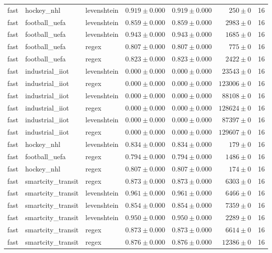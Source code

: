 \begin{table}[htbp]
\begin{tabular}{l l l r r r r}
fast & hockey\_nhl & levenshtein & $0.919\pm0.000$ & $0.919\pm0.000$ & $250\pm0$ & 16 \\
fast & football\_uefa & levenshtein & $0.859\pm0.000$ & $0.859\pm0.000$ & $2983\pm0$ & 16 \\
fast & football\_uefa & levenshtein & $0.943\pm0.000$ & $0.943\pm0.000$ & $1685\pm0$ & 16 \\
fast & football\_uefa & regex & $0.807\pm0.000$ & $0.807\pm0.000$ & $775\pm0$ & 16 \\
fast & football\_uefa & regex & $0.823\pm0.000$ & $0.823\pm0.000$ & $2422\pm0$ & 16 \\
fast & industrial\_iiot & levenshtein & $0.000\pm0.000$ & $0.000\pm0.000$ & $23543\pm0$ & 16 \\
fast & industrial\_iiot & regex & $0.000\pm0.000$ & $0.000\pm0.000$ & $123006\pm0$ & 16 \\
fast & industrial\_iiot & levenshtein & $0.000\pm0.000$ & $0.000\pm0.000$ & $88108\pm0$ & 16 \\
fast & industrial\_iiot & regex & $0.000\pm0.000$ & $0.000\pm0.000$ & $128624\pm0$ & 16 \\
fast & industrial\_iiot & levenshtein & $0.000\pm0.000$ & $0.000\pm0.000$ & $87397\pm0$ & 16 \\
fast & industrial\_iiot & regex & $0.000\pm0.000$ & $0.000\pm0.000$ & $129607\pm0$ & 16 \\
fast & hockey\_nhl & levenshtein & $0.834\pm0.000$ & $0.834\pm0.000$ & $179\pm0$ & 16 \\
fast & football\_uefa & regex & $0.794\pm0.000$ & $0.794\pm0.000$ & $1486\pm0$ & 16 \\
fast & hockey\_nhl & regex & $0.807\pm0.000$ & $0.807\pm0.000$ & $174\pm0$ & 16 \\
fast & smartcity\_transit & regex & $0.873\pm0.000$ & $0.873\pm0.000$ & $6303\pm0$ & 16 \\
fast & smartcity\_transit & levenshtein & $0.961\pm0.000$ & $0.961\pm0.000$ & $6466\pm0$ & 16 \\
fast & smartcity\_transit & levenshtein & $0.854\pm0.000$ & $0.854\pm0.000$ & $7359\pm0$ & 16 \\
fast & smartcity\_transit & levenshtein & $0.950\pm0.000$ & $0.950\pm0.000$ & $2289\pm0$ & 16 \\
fast & smartcity\_transit & regex & $0.873\pm0.000$ & $0.873\pm0.000$ & $6614\pm0$ & 16 \\
fast & smartcity\_transit & regex & $0.876\pm0.000$ & $0.876\pm0.000$ & $12386\pm0$ & 16 \\

\end{tabular}
\end{table}
